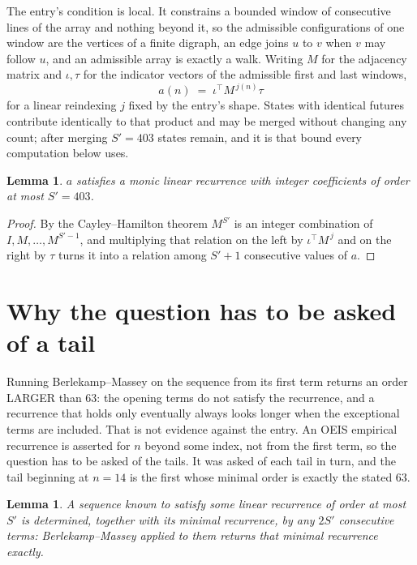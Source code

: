 \documentclass[11pt,a4paper]{article}
\theoremstyle{plain}
\newtheorem{lemma}[theorem]{Lemma}
\theoremstyle{definition}
\begin{document}
The entry's condition is local. It constrains a bounded window of consecutive lines of the
array and nothing beyond it, so the admissible configurations of one window are the vertices of
a finite digraph, an edge joins $u$ to $v$ when $v$ may follow $u$, and an admissible array is
exactly a walk. Writing $M$ for the adjacency matrix and $\iota,\tau$ for the indicator vectors
of the admissible first and last windows,
\[
a(n)\;=\;\iota^{\!\top}M^{\,j(n)}\tau
\]
for a linear reindexing $j$ fixed by the entry's shape. States with identical futures
contribute identically to that product and may be merged without changing any count; after
merging $S'=403$ states remain, and it is that bound every computation below uses.

\begin{lemma}\label{lem:cf}
$a$ satisfies a monic linear recurrence with integer coefficients of order at most $S'=403$.
\end{lemma}

\begin{proof}
By the Cayley--Hamilton theorem $M^{S'}$ is an integer combination of $I,M,\dots,M^{S'-1}$,
and multiplying that relation on the left by $\iota^{\!\top}M^{\,j}$ and on the right by
$\tau$ turns it into a relation among $S'+1$ consecutive values of $a$.
\end{proof}

\section{Why the question has to be asked of a tail}

Running Berlekamp--Massey on the sequence from its first term returns an order LARGER than $63$: the opening terms do not satisfy the recurrence, and a recurrence that holds only eventually always looks longer when the exceptional terms are included. That is not evidence against the entry. An OEIS empirical recurrence is asserted for $n$ beyond some index, not from the first term, so the question has to be asked of the tails. It was asked of each tail in turn, and the tail beginning at $n=14$ is the first whose minimal order is exactly the stated $63$.

\begin{lemma}\label{lem:bm}
A sequence known to satisfy some linear recurrence of order at most $S'$ is determined,
together with its minimal recurrence, by any $2S'$ consecutive terms: Berlekamp--Massey applied
to them returns that minimal recurrence exactly.
\end{lemma}
\end{document}
